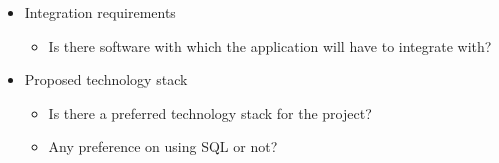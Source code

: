 \documentclass[11pt,a4paper]{article}
\begin{document}
\begin{itemize}[leftmargin=*]
\begin{itemize}
        \item Exclude some files, e.g. images, don't upload all files, just the code ones. Lecturer can exclude some files.
        \item Functionality for branches within the web app?
    \end{itemize}
    \item Integration requirements
    \begin{itemize}
        \item Is there software with which the application will have to integrate with?
    \end{itemize}
        \item Proposed technology stack
    \begin{itemize}
        \item Is there a preferred technology stack for the project?
        \item Any preference on using SQL or not?
    \end{itemize}
\end{itemize}

\vspace{2em}

            
\end{document}
